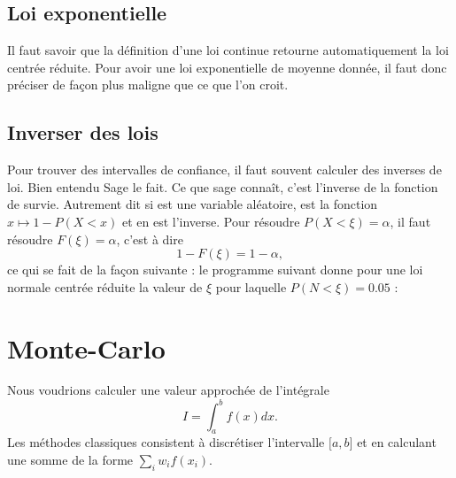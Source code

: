 \subsection{Loi exponentielle}

Il faut savoir que la définition d'une loi continue retourne automatiquement la loi centrée réduite. Pour avoir une loi exponentielle de moyenne donnée, il faut donc préciser de façon plus maligne que ce que l'on croit.



\subsection{Inverser des lois}

Pour trouver des intervalles de confiance, il faut souvent calculer des inverses de loi. Bien entendu Sage le fait. Ce que sage connaît, c'est l'inverse de la fonction de survie. Autrement dit si  est une variable aléatoire,  est la fonction \( x\mapsto 1-P(X<x)\) et  en est l'inverse. Pour résoudre \( P(X<\xi)=\alpha\), il faut résoudre \( F(\xi)=\alpha\), c'est à dire 
\begin{equation}
    1-F(\xi)=1-\alpha,
\end{equation}
ce qui se fait de la façon suivante : le programme suivant donne pour une loi normale centrée réduite la valeur de \( \xi\) pour laquelle \( P(N<\xi)=0.05\) :


\section{Monte-Carlo}

Nous voudrions calculer une valeur approchée de l'intégrale
\begin{equation}
    I=\int_a^bf(x)dx.
\end{equation}
Les méthodes classiques consistent à discrétiser l'intervalle \( \mathopen[ a , b \mathclose]\) et en calculant une somme de la forme \( \sum_iw_if(x_i)\).

